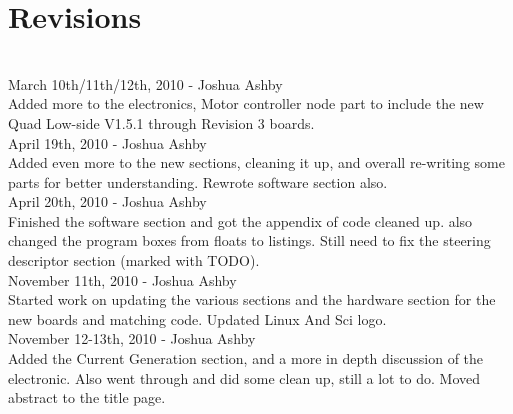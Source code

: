 \documentclass{article}
\begin{document}
\newpage
\tableofcontents
\listoffigures
\renewcommand{\lstlistlistingname}{List of Files \& Examples}
\lstlistoflistings

\newpage

\section{Revisions}\\
March 10th/11th/12th, 2010 - Joshua Ashby\\
Added more to the electronics, Motor controller node part to include the new Quad Low-side V1.5.1 through Revision 3 boards.\\
April 19th, 2010 - Joshua Ashby\\
Added even more to the new sections, cleaning it up, and overall re-writing some parts for better understanding. Rewrote software section also.\\
April 20th, 2010 - Joshua Ashby\\
Finished the software section and got the appendix of code cleaned up. also changed the program boxes from floats to listings. Still need to fix the steering descriptor section (marked with TODO).\\
November 11th, 2010 - Joshua Ashby\\
Started work on updating the various sections and the hardware section for the new boards and matching code. Updated Linux And Sci logo.\\
November 12-13th, 2010 - Joshua Ashby\\
Added the Current Generation section, and a more in depth discussion of the electronic. Also went through and did some clean up, still a lot to do. Moved abstract to the title page.\\

\newpage
\end{document}
